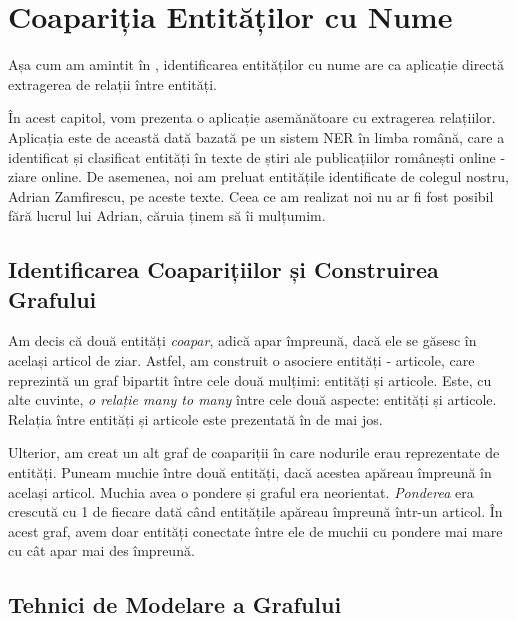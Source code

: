 \chapter{Coapariția Entităților cu Nume}
\label{chap:entities-cooccurrence}

Așa cum am amintit în , identificarea entităților cu nume are ca aplicație directă extragerea de relații între entități.

În acest capitol, vom prezenta o aplicație asemănătoare cu extragerea relațiilor. Aplicația este de această dată bazată pe un sistem NER în limba română, care a identificat și clasificat entități în texte de știri ale publicațiilor românești online - ziare online. De asemenea, noi am preluat entitățile identificate de colegul nostru, Adrian Zamfirescu, pe aceste texte. Ceea ce am realizat noi nu ar fi fost posibil fără lucrul lui Adrian, căruia ținem să îi mulțumim. 

\section{Identificarea Coaparițiilor și Construirea Grafului}

Am decis că două entități \textit{coapar}, adică apar împreună, dacă ele se găsesc în același articol de ziar. Astfel, am construit o asociere entități - articole, care reprezintă un graf bipartit între cele două mulțimi: entități și articole. Este, cu alte cuvinte, \textit{o relație many to many} între cele două aspecte: entități și articole. Relația între entități și articole este prezentată în  de mai jos.


Ulterior, am creat un alt graf de coapariții în care nodurile erau reprezentate de entități. Puneam muchie între două entități, dacă acestea apăreau împreună în același articol. Muchia avea o pondere și graful era neorientat. \textit{Ponderea} era crescută cu 1 de fiecare dată când entitățile apăreau împreună într-un articol. În acest graf, avem doar entități conectate între ele de muchii cu pondere mai mare cu cât apar mai des împreună.

\section{Tehnici de Modelare a Grafului}

